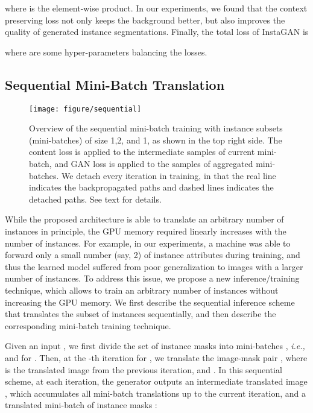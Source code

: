 \documentclass{article} \usepackage{iclr2019_conference,times}
\begin{document}
where  is the element-wise product.
In our experiments,
we found that
the context preserving loss not only keeps the background better, but also improves the quality of generated instance segmentations.
Finally, the total loss of InstaGAN is

where
 are 
some hyper-parameters balancing the losses.


\vspace{-0.025in}
\subsection{Sequential Mini-Batch Translation}
\label{sec:method-algorithm}
\vspace{-0.025in}

\begin{figure}[t]
\vspace{-0.2in}
\centering
\texttt{[image: figure/sequential]}
\caption{
Overview of the sequential mini-batch training with instance subsets (mini-batches) of size 1,2, and 1, as shown in the top right side.
The content loss is applied to the intermediate samples of current mini-batch,
and GAN loss is applied to the samples of aggregated mini-batches.
We detach every iteration in training, in that
the real line indicates the backpropagated paths and dashed lines indicates the detached paths. See text for details. 
} \label{fig:sequential}
\vspace{-0.1in}
\end{figure}






While the proposed architecture is able to translate an arbitrary number of instances in principle,
the GPU memory required linearly increases with the number of instances. 
For example, in our experiments, a machine was able to forward only a small number (say, 2) of instance attributes  during training,
and thus the learned model suffered from poor generalization to images with a larger number of instances.
To address this issue, we propose a new inference/training technique, which allows to train an arbitrary number of instances without increasing the GPU memory.
We first describe the sequential inference scheme that
translates the subset of instances sequentially, and then describe the corresponding mini-batch training technique.

Given an input ,
we first divide the set of instance masks  into  mini-batches , \textit{i.e.,}  and  for .
Then, at the -th iteration for , we translate the image-mask pair ,
where  is the translated image  from the previous iteration, and . 
In this sequential scheme, at each iteration, the generator  outputs an intermediate translated image , which accumulates all mini-batch translations up to the current iteration, and a translated mini-batch of instance masks :
\end{document}
